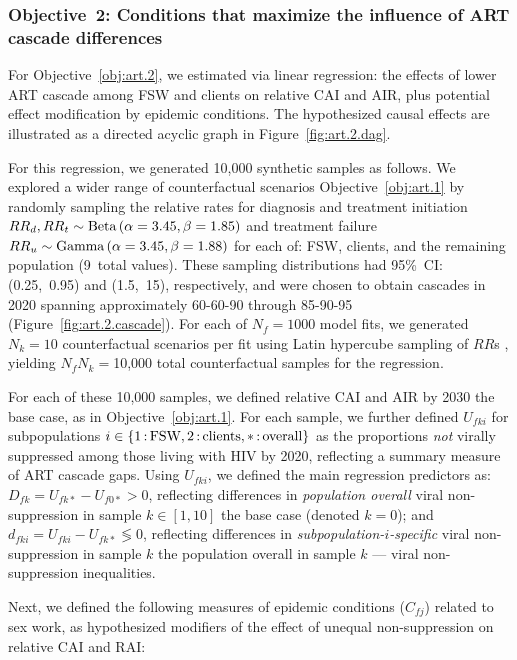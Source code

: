\subsubsection{Objective~2: Conditions that maximize the influence of ART cascade differences}\label{art.meth.obj.2}
For Objective~\ref{obj:art.2}, we estimated via linear regression:
the effects of lower ART cascade among FSW and clients on relative CAI and AIR,
plus potential effect modification by epidemic conditions.
The hypothesized causal effects are illustrated
as a directed acyclic graph in Figure~\ref{fig:art.2.dag}.
\par
For this regression, we generated 10,000 synthetic samples as follows.
We explored a wider range of counterfactual scenarios \vs Objective~\ref{obj:art.1}
by randomly sampling the relative rates for
diagnosis and treatment initiation ${RR}_d, {RR}_t \sim \textnormal{Beta}\,(\alpha=3.45,\beta=1.85)$
and treatment failure ${RR}_u \sim \textnormal{Gamma}\,(\alpha=3.45,\beta=1.88)$
for each of: FSW, clients, and the remaining population (9~total values).
These sampling distributions had 95\%~CI: (0.25,~0.95) and (1.5,~15), respectively,
and were chosen to obtain cascades in 2020 spanning
approximately \mbox{60-60-90} through \mbox{85-90-95} (Figure~\ref{fig:art.2.cascade}). %
For each of $N_f = 1000$ model fits,
we generated $N_k = 10$ counterfactual scenarios per fit
using Latin hypercube sampling of $RR$s \cite{Stein1987},
yielding $N_f N_k = {}$10,000 total counterfactual samples for the regression.
\par
For each of these 10,000 samples, we defined
relative CAI and AIR by 2030 \vs the base case, as in Objective~\ref{obj:art.1}.
For each sample, we further defined
$U_{fki}$ for subpopulations $i \in \{1{\,:\,}\textnormal{FSW}, 2{\,:\,}\textnormal{clients}, *{\,:\,}\textnormal{overall}\}$
as the proportions \emph{not} virally suppressed among those living with HIV by 2020,
reflecting a summary measure of ART cascade gaps.
Using $U_{fki}$, we defined the main regression predictors as:
$D_{fk} = U_{fk*} - U_{f0*} > 0$, reflecting differences in
\emph{population overall} viral non-suppression in sample $k \in [1,10]$
\vs the base case (denoted $k = 0$); and
$d_{fki} = U_{fki} - U_{fk*} \lessgtr 0$, reflecting differences in
\emph{subpopulation-$i$-specific} viral non-suppression in sample $k$
\vs the population overall in sample $k$ --- \ie viral non-suppression inequalities.
\par
Next, we defined the following measures of epidemic conditions ($C_{fj}$) related to sex work,
as hypothesized modifiers of the effect of unequal non-suppression on relative CAI and RAI:

